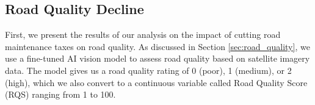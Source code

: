 

\subsection{Road Quality Decline} \label{sec:road_quality_decline}

 First, we present the results of our analysis on the impact of cutting road maintenance taxes on road quality. As discussed in Section \ref{sec:road_quality}, we use a fine-tuned AI vision model to assess road quality based on satellite imagery data. The model gives us a road quality rating of 0 (poor), 1 (medium), or 2 (high), which we also convert to a continuous variable called Road Quality Score (RQS) ranging from 1 to 100. 

